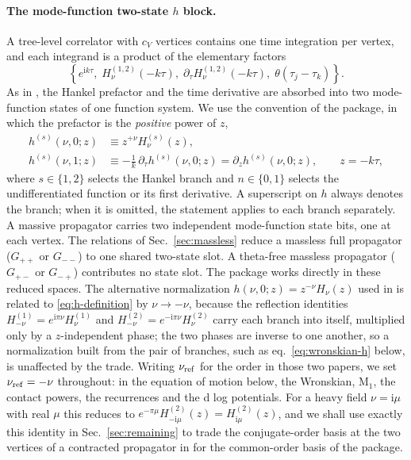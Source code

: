 \documentclass[11pt,a4paper]{article}
\numberwithin{table}{section}
\newcommand{\ii}{\mathrm i}
\begin{document}
\paragraph{The mode-function two-state $h$ block.}
A tree-level correlator with $c_V$ vertices contains one time integration per vertex, and each
integrand is a product of the elementary factors
\begin{equation}
  \left\{e^{\ii k\tau},\;H^{(1,2)}_\nu(-k\tau),\;
  \partial_\tau H^{(1,2)}_\nu(-k\tau),\;\theta(\tau_j-\tau_k)\right\}.
  \label{eq:integrand-factors}
\end{equation}
As in \cite{Chen:2024glu}, the Hankel prefactor and the time derivative are absorbed into two
mode-function states of one function system. We use the convention of the package, in which the prefactor is the
\emph{positive} power of $z$,
\begin{equation}
  \begin{aligned}
  h^{(s)}(\nu,0;z)&\equiv z^{+\nu}H^{(s)}_\nu(z),\\
  h^{(s)}(\nu,1;z)&\equiv-\frac1k\,\partial_\tau h^{(s)}(\nu,0;z)=\partial_z h^{(s)}(\nu,0;z),
  \qquad z=-k\tau,
  \end{aligned}
  \label{eq:h-definition}
\end{equation}
where $s\in\{1,2\}$ selects the Hankel branch and $n\in\{0,1\}$ selects the
undifferentiated function or its first derivative. A superscript on $h$ always denotes the
branch; when it is omitted, the statement applies to each branch separately. A massive
propagator carries two independent mode-function state bits, one at each vertex. The relations of
Sec.~\ref{sec:massless} reduce a massless full propagator ($G_{++}$ or $G_{--}$) to one
shared two-state slot. A theta-free massless propagator ($G_{+-}$ or $G_{-+}$) contributes
no state slot. The package works directly in these reduced spaces.
The alternative normalization $h(\nu,0;z)=z^{-\nu}H_\nu(z)$ used in
\cite{Chen:2023iix,Chen:2024glu} is related to \eqref{eq:h-definition} by $\nu\to-\nu$, because the
reflection identities $H^{(1)}_{-\nu}=e^{\ii\pi\nu}H^{(1)}_\nu$ and
$H^{(2)}_{-\nu}=e^{-\ii\pi\nu}H^{(2)}_\nu$ carry each branch into itself, multiplied only by a
$z$-independent phase; the two phases are inverse to one another, so a normalization built from the
pair of branches, such as eq.~\eqref{eq:wronskian-h} below, is unaffected by the trade.
Writing $\nu_{\rm ref}$ for the order in those two papers, we set $\nu_{\rm ref}=-\nu$
throughout: in the equation of motion below, the Wronskian, $\text{M}_1$, the contact powers,
the recurrences and the d log potentials. For a heavy field $\nu=\ii\mu$ with real $\mu$ this reduces to
$e^{-\pi\mu}H^{(2)}_{-\ii\mu}(z)=H^{(2)}_{\ii\mu}(z)$, and we shall use exactly this identity in
Sec.~\ref{sec:remaining} to trade the conjugate-order basis at the two vertices of a contracted propagator
in \cite{Chen:2024glu} for the common-order basis of the package.
\end{document}
